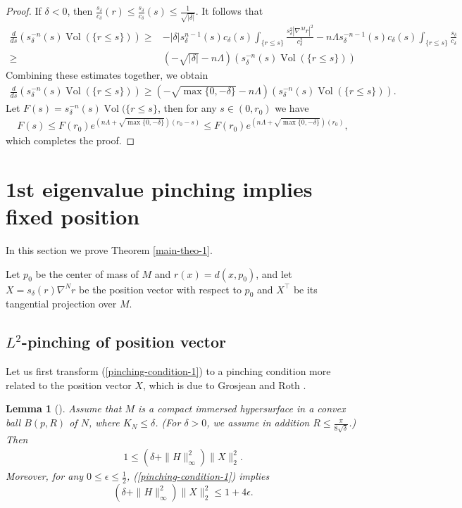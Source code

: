 \documentclass{amsart}
\numberwithin{equation}{section}
\newtheorem{lem}[theo]{Lemma}
\theoremstyle{remark}
\renewcommand{\(}{\left(}
\renewcommand{\)}{\right)}
\renewcommand{\~}{\tilde}
\renewcommand{\-}{\overline}
\renewcommand{\d}{\delta}
\newcommand{\e}{\epsilon}
\renewcommand{\L}{\Lambda}
\newcommand{\Vol}{\operatorname{Vol}}
\begin{document}
\begin{proof}
If $\d<0$, then $\frac{s_\d}{c_\d}(r)\le \frac{s_\d}{c_\d}(s) \le \frac{1}{\sqrt{|\d|}}$. It follows that
\begin{align*}
\frac{d}{ds}\(s_\d^{-n}(s)\Vol(\{r\le s\})\)
\ge & -|\d|s_\d^{n-1}(s)c_\d(s)\int_{\{r\le s\}} \frac{s_\d^2 |\nabla^M r|^2}{c_\d^2} -n\L s_\d^{-n-1}(s)c_\d(s) \int_{\{r\le s\}} \frac{s_\d}{c_\d}\\
\ge & (-\sqrt{|\d|}-n\L)\(s_\d^{-n}(s)\Vol(\{r\le s\})\)
\end{align*}
Combining these estimates together, we obtain
\begin{align*}
\frac{d}{ds}\(s_\d^{-n}(s)\Vol(\{r\le s\})\) \ge (-\sqrt{\max\{0,-\d\}}-n\L)\(s_\d^{-n}(s)\Vol(\{r\le s\})\).
\end{align*}
Let $F(s)=s_\d^{-n}(s)\Vol(\{r\le s\}$, then for any $s\in(0,r_0)$ we have
\begin{align*}
F(s) \leq F(r_0) e^{(n\L+\sqrt{\max\{0,-\d\}})(r_0-s)}\le F(r_0)e^{(n\L+\sqrt{\max\{0,-\d\}})(r_0)},
\end{align*}
which completes the proof.
\end{proof}

\section{1st eigenvalue pinching implies fixed position}
\label{sec:4}

In this section we prove Theorem \ref{main-theo-1}.

Let $p_0$ be the center of mass of $M$ and $r(x)=d(x,p_0)$, and let $X=s_\d(r)\nabla^N r$ be the position vector with respect to $p_0$ and $X^\top$ be its tangential projection over $M$.

\subsection{$L^2$-pinching of position vector}

Let us first transform  (\ref{pinching-condition-1}) to a pinching condition more related to the position vector $X$, which is due to Grosjean and Roth \cite[Proposition 2.1]{Grosjean-Roth2012}.

\begin{lem}[\cite{Grosjean-Roth2012}]\label{lem-tranform-pinching}
	Assume that $M$ is a compact immersed hypersurface in a convex ball $B(p,R)$ of $N$, where $K_N\leq \d$. (For $\d>0$, we assume in addition $R\le \frac{\pi}{8\sqrt{\d}}$.)
	Then
	\begin{align}\label{4.5}
	1\leq (\d+\|H\|_\infty^2)\|X\|_2^2.
	\end{align}
	Moreover, for any $0\le \e\le \frac{1}{2}$, (\ref{pinching-condition-1}) implies
	\begin{equation}\label{ineq-Ie}
	(\d+\|H\|_\infty^2)\|X\|_2^2 \leq 1+4\e.
	\end{equation}
	
\end{lem}
\end{document}
